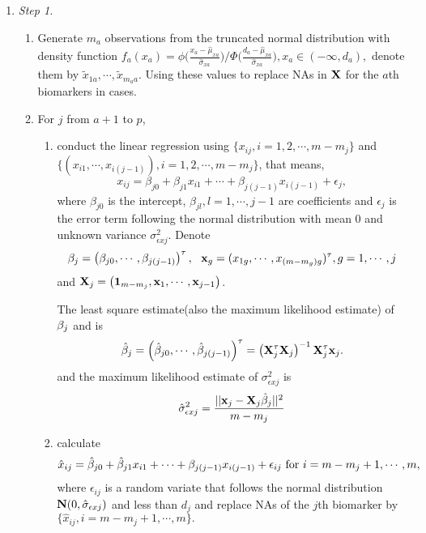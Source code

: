 \documentclass[a4,11pt,epsf, amssymb]{article}
\begin{document}
\begin{enumerate}
\renewcommand{\labelenumii}{(\arabic{enumii})}
    \item {\em Step 1.}
    \begin{enumerate}
        \item Generate $m_a$ observations from the truncated normal distribution with density function $f_a(x_a)={\phi\big(\frac{x_a-\hat\mu_{xa}}{\hat\sigma_{xa}}\big)}\big/{\Phi\big(\frac{d_a-\hat\mu_{xa}}{\hat\sigma_{xa}}\big)},x_a\in(-\infty,d_a),$
denote them by $\tilde x_{1a},\cdots, \tilde x_{m_aa}.$ Using these values to replace NAs in $\bf X$ for the $a$th biomarkers in cases.
        \item For $j$ from $a+1$ to $p$,
            \begin{enumerate}
                \item conduct the linear regression using $\{x_{ij},i=1,2,\cdots,m-m_j\}$ and $\{(x_{i1},\cdots,x_{i(j-1)}), i=1,2,\cdots,m-m_j\}$, that means,
$$x_{ij}=\beta_{j0}+\beta_{j1}x_{i1}+\cdots+\beta_{j(j-1)}x_{i(j-1)}+\epsilon_j,$$
where  $\beta_{j0}$ is the intercept, $\beta_{jl},l=1,\cdots,j-1$ are coefficients and $\epsilon_j$ is the error term following the normal distribution with mean 0 and unknown variance $\sigma_{\epsilon xj}^2$.
Denote
$${\beta}_j=\left(\beta_{j0}, \cdots, \beta_{j(j-1)}\right)^\tau,~~ {\bf x}_g= (x_{1g},\cdots,x_{(m-m_g)g})^\tau, g=1,\cdots,j$$ and
${\bf X}_j=\left({\bf1}_{m-m_j},{\bf x}_1,\cdots,{\bf x}_{j-1}\right)$.

The least square estimate(also the maximum likelihood estimate) of ${\bf\beta}_j$  and is
$$\hat {\bf\beta}_j=\left(\hat\beta_{j0}, \cdots, \hat\beta_{j(j-1)}\right)^\tau  =\left( {\bf X}_j^\tau{\bf X}_j\right)^{-1} {\bf X}_j^\tau  {\bf x}_j. $$
and the maximum likelihood estimate of $\sigma_{\epsilon xj}^2$ is
$$\hat{\sigma}_{\epsilon xj}^2 = \frac{||{\bf x}_j - {\bf X}_j\hat {\bf\beta}_j||^2}{m - m_j}$$
                 \item calculate $$\hat x_{ij} = \hat{\beta}_{j0}+\hat{\beta}_{j1}x_{i1}+\cdots+\beta_{j(j-1)}x_{i(j-1)} + \epsilon_{ij}~ \hbox{for} ~i=m-m_j+1,\cdots,m,$$
where $\epsilon_{ij}$ is a random variate that follows the normal distribution ${\bf N} (0, \hat{\sigma}_{\epsilon xj})$ and less than $d_j$ and replace NAs of the $j$th biomarker by  $\{\hat{x}_{ij}, i=m-m_j+1,\cdots,m\}.$



\end{enumerate}
\end{enumerate}
\end{enumerate}
\end{document}
